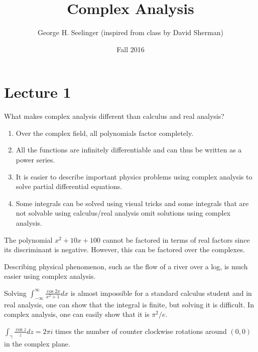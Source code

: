 \documentclass[11pt,leqno,oneside]{amsart}
\title[Complex Analysis]{Complex Analysis}
\author{George H. Seelinger (inspired from class by David Sherman)}
\date{Fall 2016}
\numberwithin{thm}{section}
\begin{document}
\maketitle
\section{Lecture 1}
What makes complex analysis different than calculus and real analysis?

\begin{enumerate}
    \item Over the complex field, all polynomials factor completely.
    \item All the functions are infinitely differentiable and can thus be written as a power series.
    \item It is easier to describe important physics problems using complex analysis to solve partial differential equations.
    \item Some integrals can be solved using visual tricks and some integrals that are not solvable using calculus/real analysis omit solutions using complex analysis.

\end{enumerate}
\begin{example}
    The polynomial $x^2+10x+100$ cannot be factored in terms of real factors since its discriminant is negative. However, this can be factored over the complexes.
\end{example}
\begin{example}
    Describing physical phenomenon, such as the flow of a river over a log, is much easier using complex analysis.
\end{example}
\begin{example}
    Solving $\int_{-\infty}^{\infty} \frac{\cos 2x}{x^2+1} dx$ is almost impossible for a standard calculus student and in real analysis, one can show that the integral is finite, but solving it is difficult. In complex analysis, one can easily show that it is $\pi^2/e$.
\end{example}
\begin{example}
    $\int_{\gamma} \frac{\cos z}{z} dz = 2 \pi i $ times the number of counter clockwise rotations around $(0,0)$ in the complex plane.
\end{example}
\end{document}
